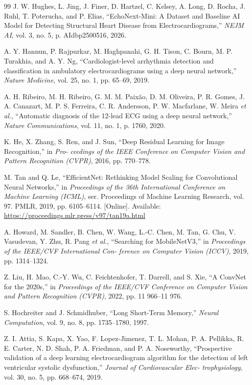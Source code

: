 \begin{thebibliography}{99}
 J. W. Hughes, L. Jing, J. Finer, D. Hartzel, C. Kelsey, A. Long, D. Rocha, J. Ruhl, T. Poterucha, and P. Elias, ``EchoNext-Mini: A Dataset and Baseline AI Model for Detecting Structural Heart Disease from Electrocardiograms,'' \emph{NEJM AI}, vol. 3, no. 5, p. AIdbp2500516, 2026.

 A. Y. Hannun, P. Rajpurkar, M. Haghpanahi, G. H. Tison, C. Bourn, M. P. Turakhia, and A. Y. Ng, ``Cardiologist-level arrhythmia detection and classification in ambulatory electrocardiograms using a deep neural network,'' \emph{Nature Medicine}, vol. 25, no. 1, pp. 65--69, 2019.

 A. H. Ribeiro, M. H. Ribeiro, G. M. M. Paixão, D. M. Oliveira, P. R. Gomes, J. A. Canazart, M. P. S. Ferreira, C. R. Andersson, P. W. Macfarlane, W. Meira \emph{et al.}, ``Automatic diagnosis of the 12-lead ECG using a deep neural network,'' \emph{Nature Communications}, vol. 11, no. 1, p. 1760, 2020.

 K. He, X. Zhang, S. Ren, and J. Sun, ``Deep Residual Learning for Image Recognition,'' in \emph{Pro-} \emph{ceedings of the IEEE Conference on Computer Vision and Pattern Recognition (CVPR)}, 2016, pp. 770--778.

 M. Tan and Q. Le, ``EfficientNet: Rethinking Model Scaling for Convolutional Neural Networks,'' in \emph{Proceedings of the 36th International Conference on Machine Learning (ICML)}, ser. Proceedings of Machine Learning Research, vol. 97. PMLR, 2019, pp. 6105--6114. [Online]. Available: \url{https://proceedings.mlr.press/v97/tan19a.html}

 A. Howard, M. Sandler, B. Chen, W. Wang, L.-C. Chen, M. Tan, G. Chu, V. Vasudevan, Y. Zhu, R. Pang \emph{et al.}, ``Searching for MobileNetV3,'' in \emph{Proceedings of the IEEE/CVF International Con-} \emph{ference on Computer Vision (ICCV)}, 2019, pp. 1314--1324.

 Z. Liu, H. Mao, C.-Y. Wu, C. Feichtenhofer, T. Darrell, and S. Xie, ``A ConvNet for the 2020s,'' in \emph{Proceedings of the IEEE/CVF Conference on Computer Vision and Pattern Recognition (CVPR)}, 2022, pp. 11 966--11 976.

 S. Hochreiter and J. Schmidhuber, ``Long Short-Term Memory,'' \emph{Neural Computation}, vol. 9, no. 8, pp. 1735--1780, 1997.

 Z. I. Attia, S. Kapa, X. Yao, F. Lopez-Jimenez, T. L. Mohan, P. A. Pellikka, R. E. Carter, N. D. Shah, P. A. Friedman, and P. A. Noseworthy, ``Prospective validation of a deep learning electrocardiogram algorithm for the detection of left ventricular systolic dysfunction,'' \emph{Journal of Cardiovascular Elec-} \emph{trophysiology}, vol. 30, no. 5, pp. 668--674, 2019.


\end{thebibliography}

